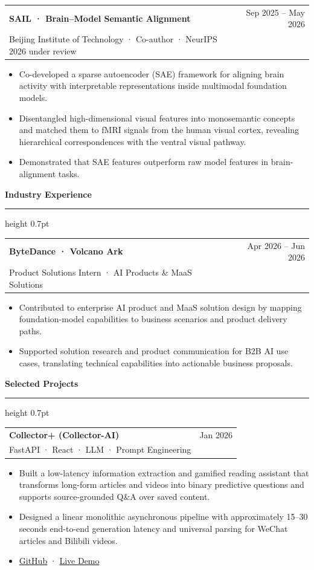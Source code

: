 \documentclass[10pt,a4paper]{article}
\makeatletter
\newcommand{\cvsection}[1]{%
  \vspace{0.72em}
  {\large\bfseries\color{Ink} #1}\par
  \vspace{0.22em}
  {\color{Rule}\hrule height 0.7pt}
  \vspace{0.36em}
}
\newcommand{\entryheading}[3]{%
  \begin{tabularx}{\textwidth}{@{}Xr@{}}
    {\bfseries\color{Ink} #1} & {\small\color{Muted} #3} \\
    {\small\color{Accent} #2} &
  \end{tabularx}
  \vspace{-0.28em}
}
\newcommand{\projectheading}[3]{%
  \begin{tabularx}{\textwidth}{@{}Xr@{}}
    {\bfseries\color{Ink} #1} & {\small\color{Muted} #3} \\
    {\small\color{Muted} #2} &
  \end{tabularx}
  \vspace{-0.28em}
}
\makeatother
\begin{document}
\vspace{0.25em}
\entryheading{SAIL · Brain--Model Semantic Alignment}{Beijing Institute of Technology · Co-author · NeurIPS 2026 under review}{Sep 2025 -- May 2026}
\begin{itemize}
  \item Co-developed a sparse autoencoder (SAE) framework for aligning brain activity with interpretable representations inside multimodal foundation models.
  \item Disentangled high-dimensional visual features into monosemantic concepts and matched them to fMRI signals from the human visual cortex, revealing hierarchical correspondences with the ventral visual pathway.
  \item Demonstrated that SAE features outperform raw model features in brain-alignment tasks.
\end{itemize}

\cvsection{Industry Experience}

\entryheading{ByteDance · Volcano Ark}{Product Solutions Intern · AI Products \& MaaS Solutions}{Apr 2026 -- Jun 2026}
\begin{itemize}
  \item Contributed to enterprise AI product and MaaS solution design by mapping foundation-model capabilities to business scenarios and product delivery paths.
  \item Supported solution research and product communication for B2B AI use cases, translating technical capabilities into actionable business proposals.
\end{itemize}

\cvsection{Selected Projects}

\projectheading{Collector+ (Collector-AI)}{FastAPI · React · LLM · Prompt Engineering}{Jan 2026}
\begin{itemize}
  \item Built a low-latency information extraction and gamified reading assistant that transforms long-form articles and videos into binary predictive questions and supports source-grounded Q\&A over saved content.
  \item Designed a linear monolithic asynchronous pipeline with approximately 15--30 seconds end-to-end generation latency and universal parsing for WeChat articles and Bilibili videos.
  \item \href{https://github.com/Sophie618/Creator_ai}{GitHub} · \href{https://collectorai.top/}{Live Demo}
\end{itemize}
\end{document}
